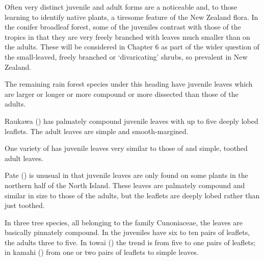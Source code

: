 Often very distinct juvenile and adult forms are a noticeable and, to those learning to identify native plants, a tiresome feature of the New Zealand flora.
In the conifer broadleaf forest, some of the juveniles contrast with those of the tropics in that they are very freely branched with leaves much smaller than on the adults.
These will be considered in Chapter 6 as part of the wider question of the small-leaved, freely branched or `divaricating' shrubs, so prevalent in New Zealand.

The remaining rain forest species under this heading have juvenile leaves which are larger or longer or more compound or more dissected than those of the adults.

Raukawa () has palmately compound juvenile leaves with up to five deeply lobed leaflets.
The adult leaves are simple and smooth-margined.

One variety of  has juvenile leaves very similar to those of  and simple, toothed adult leaves.

Pate () is unusual in that juvenile leaves are only found on some plants in the northern half of the North Island.
These leaves are palmately compound and similar in size to those of the adults, but the leaflets are deeply lobed rather than just toothed.

In three tree species, all belonging to the family Cunoniaceae, the leaves are basically pinnately compound.
In  the juveniles have six to ten pairs of leaflets, the adults three to five.
In towai () the trend is from five to one pairs of leaflets; in kamahi () from one or two pairs of leaflets to simple leaves.

